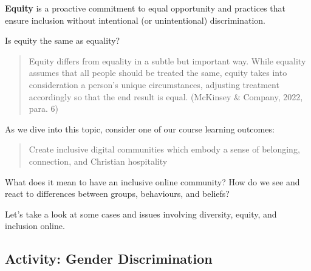 \documentclass[
  letterpaper,
  DIV=11,
  numbers=noendperiod]{scrreprt}
\begin{document}
\textbf{Equity} is a proactive commitment to equal opportunity and
practices that ensure inclusion without intentional (or unintentional)
discrimination.

Is equity the same as equality?

\begin{quote}
Equity differs from equality in a subtle but important way. While
equality assumes that all people should be treated the same, equity
takes into consideration a person's unique circumstances, adjusting
treatment accordingly so that the end result is equal. (McKinsey \&
Company, 2022, para. 6)
\end{quote}

As we dive into this topic, consider one of our course learning
outcomes:

\begin{quote}
Create inclusive digital communities which embody a sense of belonging,
connection, and Christian hospitality
\end{quote}

What does it mean to have an inclusive online community? How do we see
and react to differences between groups, behaviours, and beliefs?

Let's take a look at some cases and issues involving diversity, equity,
and inclusion online.

\subsection{Activity: Gender
Discrimination}\label{activity-gender-discrimination}
\end{document}
